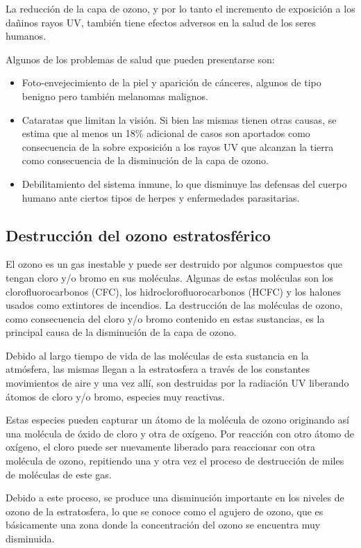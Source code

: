 	La reducción de la capa de ozono, y por lo tanto el incremento de exposición a los dañinos rayos UV, también tiene efectos adversos en la salud de los seres humanos. 

	Algunos de los problemas de salud que pueden presentarse son:

	\begin{itemize}
		\item Foto-envejecimiento de la piel y aparición de cánceres, algunos de tipo benigno pero también melanomas malignos.
		\item Cataratas que limitan la visión. Si bien las mismas tienen otras causas, se estima que al menos un 18\% adicional de casos son aportados como consecuencia de la sobre exposición a los rayos UV que alcanzan la tierra como consecuencia de la disminución de la capa de ozono.
		\item Debilitamiento del sistema inmune, lo que disminuye las defensas del cuerpo humano ante ciertos tipos de herpes y enfermedades parasitarias.
	\end{itemize}

	\subsection{Destrucción del ozono estratosférico}

	El ozono es un gas inestable y puede ser destruido por algunos compuestos que tengan cloro y/o bromo en sus moléculas. Algunas de estas moléculas son los clorofluorocarbonos (CFC), los hidroclorofluorocarbonos (HCFC) y los halones usados como extintores de incendios. La destrucción de las moléculas de ozono, como consecuencia del cloro y/o bromo contenido en estas sustancias, es la principal causa de la disminución de la capa de ozono. 

	Debido al largo tiempo de vida de las moléculas de esta sustancia en la atmósfera, las mismas llegan a la estratosfera a través de los constantes movimientos de aire y una vez allí, son destruidas por la radiación UV liberando átomos de cloro y/o bromo, especies muy reactivas.

	Estas especies pueden capturar un átomo de la molécula de ozono originando así una molécula de óxido de cloro y otra de oxígeno. Por reacción con otro átomo de oxígeno, el cloro puede ser nuevamente liberado para reaccionar con otra molécula de ozono, repitiendo una y otra vez el proceso de destrucción de miles de moléculas de este gas. 

	Debido a este proceso, se produce una disminución importante en los niveles de ozono de la estratosfera, lo que se conoce como el agujero de ozono, que es básicamente una zona donde la concentración del ozono se encuentra muy disminuida.

